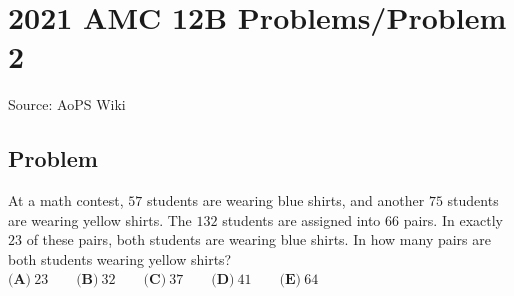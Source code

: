 \documentclass[12pt]{article}
\begin{document}
\section*{{2021 AMC 12B Problems/Problem 2}}
Source: AoPS Wiki

\subsection*{Problem}
At a math contest, $57$ students are wearing blue shirts, and another $75$ students are wearing yellow shirts. The $132$ students are assigned into $66$ pairs. In exactly $23$ of these pairs, both students are wearing blue shirts. In how many pairs are both students wearing yellow shirts? $\textbf{(A)} ~23 \qquad\textbf{(B)} ~32 \qquad\textbf{(C)} ~37 \qquad\textbf{(D)} ~41 \qquad\textbf{(E)} ~64$
\end{document}
